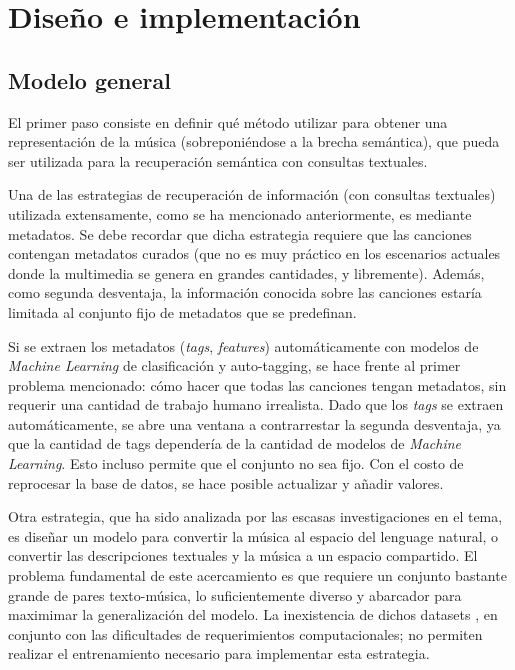 \chapter{Diseño e implementación}
\label{chap:design-implem}
\section{Modelo general}
\label{sec:design}
El primer paso consiste en definir qué método utilizar para obtener una representación de la música (sobreponiéndose a la brecha semántica), que pueda ser utilizada para la recuperación semántica con consultas textuales.

Una de las estrategias de recuperación de información (con consultas textuales) utilizada extensamente, como se ha mencionado anteriormente, es mediante metadatos. Se debe recordar que dicha estrategia requiere que las canciones contengan metadatos curados (que no es muy práctico en los escenarios actuales donde la multimedia se genera en grandes cantidades, y libremente). Además, como segunda desventaja, la información conocida sobre las canciones estaría limitada al conjunto fijo de metadatos que se predefinan. 

Si se extraen los metadatos (\textit{tags}, \textit{features}) automáticamente con modelos de \textit{Machine Learning} de clasificación y auto-tagging, se hace frente al primer problema mencionado: cómo hacer que todas las canciones tengan metadatos, sin requerir una cantidad de trabajo humano irrealista. Dado que los \textit{tags} se extraen automáticamente, se abre una ventana a contrarrestar la segunda desventaja, ya que la cantidad de tags dependería de la cantidad de modelos de \textit{Machine Learning}. Esto incluso permite que el conjunto no sea fijo. Con el costo de reprocesar la base de datos, se hace posible actualizar y añadir valores.

Otra estrategia, que ha sido analizada por las escasas investigaciones en el tema, es diseñar un modelo para convertir la música al espacio del lenguage natural, o convertir las descripciones textuales y la música a un espacio compartido. El problema fundamental de este acercamiento es que requiere un conjunto bastante grande de pares texto-música, lo suficientemente diverso y abarcador para maximimar la generalización del modelo. La inexistencia de dichos datasets \cite{Simonetta2019MultimodalMI, Huang2022MuLanAJ, Manco2022ContrastiveAL}, en conjunto con las dificultades de requerimientos computacionales; no permiten realizar el entrenamiento necesario para implementar esta estrategia. 

